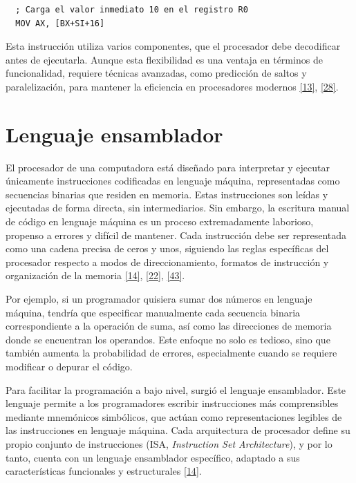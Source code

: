 \documentclass[12pt,oneside]{templates/unerthesis}
\begin{document}
\begin{lstlisting}
  ; Carga el valor inmediato 10 en el registro R0
  MOV AX, [BX+SI+16]
  \end{lstlisting}

Esta instrucción utiliza varios componentes, que el procesador debe decodificar antes de ejecutarla. Aunque esta flexibilidad es una ventaja en términos de funcionalidad, requiere técnicas avanzadas, como predicción de saltos y paralelización, para mantener la eficiencia en procesadores modernos \protect\hyperlink{ref-hennessy2017computer}{{[}13{]}}, \protect\hyperlink{ref-patterson_computer_2014}{{[}28{]}}.

\hypertarget{lenguaje-ensamblador}{%
\section{Lenguaje ensamblador}\label{lenguaje-ensamblador}}

El procesador de una computadora está diseñado para interpretar y ejecutar únicamente instrucciones codificadas en lenguaje máquina, representadas como secuencias binarias que residen en memoria. Estas instrucciones son leídas y ejecutadas de forma directa, sin intermediarios. Sin embargo, la escritura manual de código en lenguaje máquina es un proceso extremadamente laborioso, propenso a errores y difícil de mantener. Cada instrucción debe ser representada como una cadena precisa de ceros y unos, siguiendo las reglas específicas del procesador respecto a modos de direccionamiento, formatos de instrucción y organización de la memoria \protect\hyperlink{ref-stallings_computer_2021}{{[}14{]}}, \protect\hyperlink{ref-tanenbaum_structured_2016}{{[}22{]}}, \protect\hyperlink{ref-irvine2011assembly}{{[}43{]}}.

Por ejemplo, si un programador quisiera sumar dos números en lenguaje máquina, tendría que especificar manualmente cada secuencia binaria correspondiente a la operación de suma, así como las direcciones de memoria donde se encuentran los operandos. Este enfoque no solo es tedioso, sino que también aumenta la probabilidad de errores, especialmente cuando se requiere modificar o depurar el código.

Para facilitar la programación a bajo nivel, surgió el lenguaje ensamblador. Este lenguaje permite a los programadores escribir instrucciones más comprensibles mediante mnemónicos simbólicos, que actúan como representaciones legibles de las instrucciones en lenguaje máquina. Cada arquitectura de procesador define su propio conjunto de instrucciones (ISA, \emph{Instruction Set Architecture}), y por lo tanto, cuenta con un lenguaje ensamblador específico, adaptado a sus características funcionales y estructurales \protect\hyperlink{ref-stallings_computer_2021}{{[}14{]}}.
\end{document}
